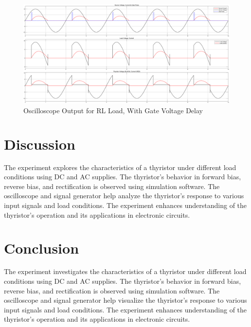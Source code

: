\documentclass[12pt]{article}
\begin{document}
\begin{figure}[H]
    \centering
    \includegraphics[width=\textwidth]{rl_delay.png}
    \caption{Oscilloscope Output for RL Load, With Gate Voltage Delay}
    \label{fig:rlLoadDelay}
\end{figure}

\section*{Discussion}
The experiment explores the characteristics of a thyristor under different load conditions using DC and AC supplies. The thyristor's behavior in forward bias, reverse bias, and rectification is observed using simulation software. The oscilloscope and signal generator help analyze the thyristor's response to various input signals and load conditions. The experiment enhances understanding of the thyristor's operation and its applications in electronic circuits.

\section*{Conclusion}
The experiment investigates the characteristics of a thyristor under different load conditions using DC and AC supplies. The thyristor's behavior in forward bias, reverse bias, and rectification is observed using simulation software. The oscilloscope and signal generator help visualize the thyristor's response to various input signals and load conditions. The experiment enhances understanding of the thyristor's operation and its applications in electronic circuits.


\renewcommand{\bibname}{References}

\end{document}
